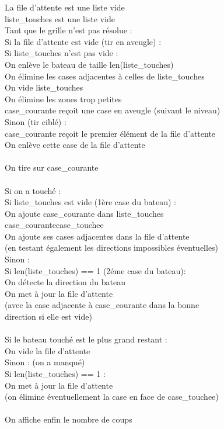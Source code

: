 {
\begin{frame}[allowframebreaks]
La file d'attente est une liste vide\\
liste\_touches est une liste vide\\
Tant que le grille n'est pas résolue :\\
Si la file d'attente est vide (tir en aveugle) :\\
Si liste\_touches n'est pas vide :\\
On enlève le bateau de taille len(liste\_touches)\\
On élimine les cases adjacentes à celles de liste\_touches\\
On vide liste\_touches\\
On élimine les zones trop petites\\
case\_courante reçoit une case en aveugle (suivant le niveau)\\
\framebreak
{}Sinon (tir ciblé) :\\
case\_courante reçoit le premier élément de la file d'attente\\
On enlève cette case de la file d'attente\\~\\
On tire sur case\_courante\\~\\
Si on a touché :\\
Si liste\_touches est vide (1ère case du bateau) :\\
On ajoute case\_courante dans liste\_touches\\
case\_courante\sto case\_touchee\\
On ajoute ses cases adjacentes dans la file d'attente\\
(en testant également les directions impossibles éventuelles)\\
\framebreak
{}Sinon :\\
Si len(liste\_touches) == 1 (2éme case du bateau):\\
On détecte la direction du bateau\\
On met à jour la file d'attente\\
(avec la case adjacente à case\_courante dans la bonne\\
 direction si elle est vide)\\~\\
Si le bateau touché est le plus grand restant :\\
On vide la file d'attente\\
\framebreak
{}Sinon : (on a manqué)\\
Si len(liste\_touches) == 1 :\\
On met à jour la file d'attente\\
(on élimine éventuellement la case en face de case\_touchee)\\~\\
On affiche enfin le nombre de coups\\
\end{frame}
}

